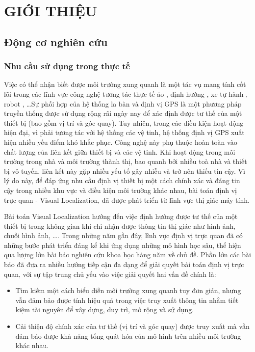 \chapter{GIỚI THIỆU}

\section{Động cơ nghiên cứu}

\subsection{Nhu cầu sử dụng trong thực tế}

Việc có thể nhận biết được môi trường xung quanh là một tác vụ mang tính cốt lõi trong các lĩnh vực công nghệ tương tác thực tế ảo \cite{middelberg2014scalable}, định hướng \cite{sarlin2023orienternet}, xe tự hành \cite{chaabane2021end}, robot \cite{sunderhauf2015place}, \dots Sự phối hợp của hệ thống la bàn và định vị GPS là một phương pháp truyền thống được sử dụng rộng rãi ngày nay để xác định được tư thế của một thiết bị (bao gồm vị trí và góc quay). Tuy nhiên, trong các điều kiện hoạt động hiện đại, vì phải tương tác với hệ thống các vệ tinh, hệ thống định vị GPS xuất hiện nhiều yếu điểm khó khắc phục. Công nghệ này phụ thuộc hoàn toàn vào chất lượng của liên kết giữa thiết bị và các vệ tinh. Khi hoạt động trong môi trường trong nhà và môi trường thành thị, bao quanh bởi nhiều toà nhà và thiết bị vô tuyến, liên kết này gặp nhiều yếu tố gây nhiễu và trở nên thiếu tin cậy. Vì lý do này, để đáp ứng nhu cầu định vị thiết bị một cách chính xác và đáng tin cậy trong nhiều khu vực và điều kiện môi trường khác nhau, bài toán định vị trực quan - Visual Localization, đã được phát triển từ lĩnh vực thị giác máy tính.

Bài toán Visual Localization hướng đến việc định hướng được tư thế của một thiết bị trong không gian khi chỉ nhận được thông tin thị giác như hình ảnh, chuỗi hình ảnh, \dots. Trong những năm gần đây, lĩnh vực định vị trực quan đã có những bước phát triển đáng kể khi ứng dụng những mô hình học sâu, thể hiện qua lượng lớn bài báo nghiên cứu khoa học hàng năm về chủ đề. Phần lớn các bài báo đã đưa ra nhiều hướng tiếp cận đa dạng để giải quyết bài toán định vị trực quan, với sự tập trung chủ yếu vào việc giải quyết hai vấn đề chính là:
\begin{itemize}
  \item Tìm kiếm một cách biểu diễn môi trường xung quanh tuy đơn giản, nhưng vẫn đảm bảo được tính hiệu quả trong việc truy xuất thông tin nhằm tiết kiệm tài nguyên để xây dựng, duy trì, mở rộng và sử dụng.
  \item Cải thiện độ chính xác của tư thế (vị trí và góc quay) được truy xuất mà vẫn đảm bảo được khả năng tổng quát hóa của mô hình trên nhiều môi trường khác nhau.
\end{itemize}

